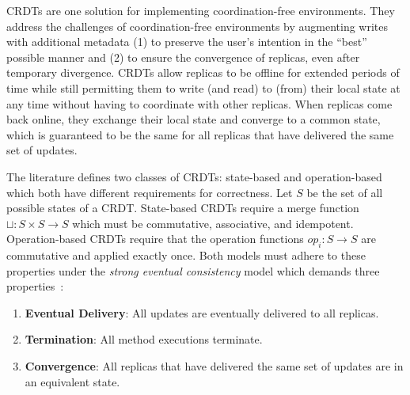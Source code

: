 \Acfp{CRDT}\footnotemark{} are one solution for implementing co\-ordi\-nation-free
environments.
They address the challenges of coordination-free environments by augmenting
writes with additional metadata (1) to preserve the user's intention
in the ``best'' possible manner and (2) to ensure the convergence of replicas,
even after temporary divergence.
\acp{CRDT} allow replicas to be offline for extended periods of time
while still permitting them to write (and read) to (from) their local state
at any time without having to coordinate with other replicas.
When replicas come back online, they exchange their local state
and converge to a common state, which is guaranteed to be the same for all
replicas that have delivered the same set of updates.


The literature defines two classes of \acp{CRDT}: state-based and operation-based
which both have different requirements for correctness.
Let \( S \) be the set of all possible states of a \ac{CRDT}.
State-based \acp{CRDT} require a merge function \( \sqcup: S \times S \to S \)
which must be commutative, associative, and idempotent.
Operation-based \acp{CRDT} require that the operation functions \( op_i: S \to S \)
are commutative and applied exactly once.
Both models must adhere to these properties under the \emph{strong eventual consistency}
model which demands three properties~\cite{shapiro2011comprehensive}:

\begin{enumerate}
    \item \textbf{Eventual Delivery}: All updates are eventually delivered to
          all replicas.
    \item \textbf{Termination}: All method executions terminate.
    \item \textbf{Convergence}: All replicas that have delivered the same set of
          updates are in an equivalent state.
\end{enumerate}

